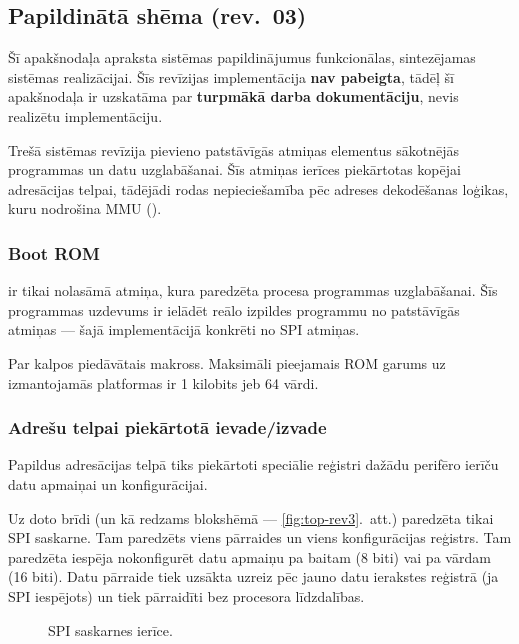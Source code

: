 \subsection{Papildinātā shēma (rev.~03)}
Šī apakšnodaļa apraksta sistēmas papildinājumus funkcionālas, sintezējamas
sistēmas realizācijai. Šīs revīzijas implementācija \textbf{nav pabeigta},
tādēļ šī apakšnodaļa ir uzskatāma par \textbf{turpmākā darba dokumentāciju},
nevis realizētu implementāciju.

Trešā sistēmas revīzija pievieno patstāvīgās atmiņas elementus sākotnējās
programmas un datu uzglabāšanai. Šīs atmiņas ierīces piekārtotas kopējai
adresācijas telpai, tādējādi rodas nepieciešamība pēc adreses dekodēšanas
loģikas, kuru nodrošina MMU ().



\subsubsection{Boot ROM}
	 ir tikai nolasāmā atmiņa, kura paredzēta
	 procesa programmas uzglabāšanai.
	Šīs programmas uzdevums ir ielādēt reālo izpildes programmu no
	patstāvīgās atmiņas — šajā implementācijā konkrēti 
	no SPI  atmiņas.
	
	Par  kalpos  piedāvātais
	 makross.
	Maksimāli pieejamais ROM garums uz izmantojamās platformas ir
	1 kilobits jeb 64 vārdi.

\subsubsection{Adrešu telpai piekārtotā ievade/izvade}
	Papildus adresācijas telpā tiks piekārtoti speciālie reģistri dažādu
	perifēro ierīču datu apmaiņai un konfigurācijai.
	
	Uz doto brīdi (un kā redzams blokshēmā — \ref{fig:top-rev3}.~att.)
	paredzēta tikai SPI saskarne. Tam paredzēts viens pārraides un viens
	konfigurācijas reģistrs. Tam paredzēta iespēja nokonfigurēt datu
	apmaiņu pa baitam (8 biti) vai pa vārdam (16 biti). Datu pārraide tiek
	uzsākta uzreiz pēc jauno datu ierakstes reģistrā (ja SPI iespējots) un
	tiek pārraidīti bez procesora līdzdalības.
	
	\begin{figure}[thp]
		\centering
		\def\svgscale{1.25}
		{\ttfamily\scriptsize}
		\caption{SPI saskarnes ierīce.}
		\label{fig:spi}
	\end{figure}
	
